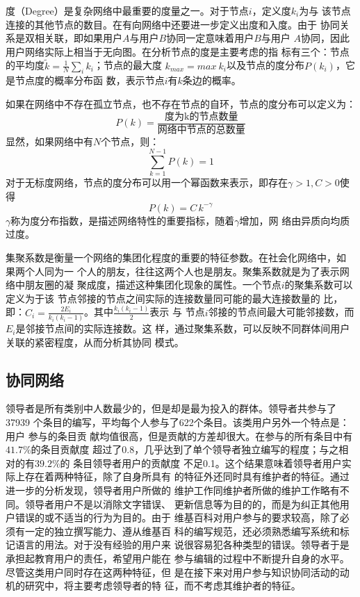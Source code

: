 度（Degree）是复杂网络中最重要的度量之一。对于节点$i$，定义度$k_i$为与
该节点连接的其他节点的数目。在有向网络中还要进一步定义出度和入度。由于
协同关系是双相关联，即如果用户$A$与用户$B$协同一定意味着用户$B$与用户
$A$协同，因此用户网络实际上相当于无向图。在分析节点的度是主要考虑的指
标有三个：节点的平均度$\tilde{ k}=\frac{1}{N}\sum_i k_i$；节点的最大度
$k_{max}=max \  k_i$以及节点的度分布$P(k_i)$，它是节点度的概率分布函
数，表示节点$i$有$k$条边的概率。

如果在网络中不存在孤立节点，也不存在节点的自环，节点的度分布可以定义为：
\[
P(k)=\frac{\text{度为k的节点数量}}{\text{网络中节点的总数量}}
\]
显然，如果网络中有$N$个节点，则：
\[
\sum_{k=1}^{N-1}P(k)=1
\]
对于无标度网络，节点的度分布可以用一个幂函数来表示，即存在$\gamma>1,
C>0$使得
\[
P(k)= C \, k^{- \gamma}
\]
$\gamma$称为度分布指数，是描述网络特性的重要指标，随着$\gamma$增加，网
络由异质向均质过度。

集聚系数是衡量一个网络的集团化程度的重要的特征参数。在社会化网络中，如
果两个人同为一
个人的朋友，往往这两个人也是朋友。聚集系数就是为了表示网络中朋友圈的凝
聚成度，描述这种集团化现象的属性。一个节点$i$的聚集系数可以定义为于该
节点邻接的节点之间实际的连接数量同可能的最大连接数量的
比，即：$C_i=\frac{2E_i}{k_i(k_i-1)}$。其中$\frac{k_i(k_i-1)}{2}$表示
与
节点$i$邻接的节点间最大可能邻接数，而$E_i$是邻接节点间的实际连接数。这
样，通过聚集系数，可以反映不同群体间用户关联的紧密程度，从而分析其协同
模式。

\subsection{协同网络}


领导者是所有类别中人数最少的，但是却是最为投入的群体。领导者共参与了37939
个条目的编写，平均每个人参与了622个条目。该类用户另外一个特点是：用户
参与的条目贡
献均值很高，但是贡献的方差却很大。在参与的所有条目中有$41.7\%$的条目贡献度
超过了0.8，几乎达到了单个领导者独立编写的程度；与之相对的有$39.2\%$的
条目领导者用户的贡献度
不足0.1。这个结果意味着领导者用户实际上存在着两种特征，除了自身所具有
的特征外还同时具有维护者的特征。通过进一步的分析发现，领导者用户所做的
维护工作同维护者所做的维护工作略有不同。领导者用户不是以消除文字错误、
更新信息等为目的的，而是为纠正其他用户错误的或不适当的行为为目的。由于
维基百科对用户参与的要求较高，除了必须有一定的独立撰写能力、遵从维基百
科的编写规范，还必须熟悉编写系统和标记语言的用法。对于没有经验的用户来
说很容易犯各种类型的错误。领导者于是承担起教育用户的责任，希望用户能在
参与编辑的过程中不断提升自身的水平。尽管这类用户同时存在这两种特征，但
是在接下来对用户参与知识协同活动的动机的研究中，将主要考虑领导者的特
征，而不考虑其维护者的特征。

